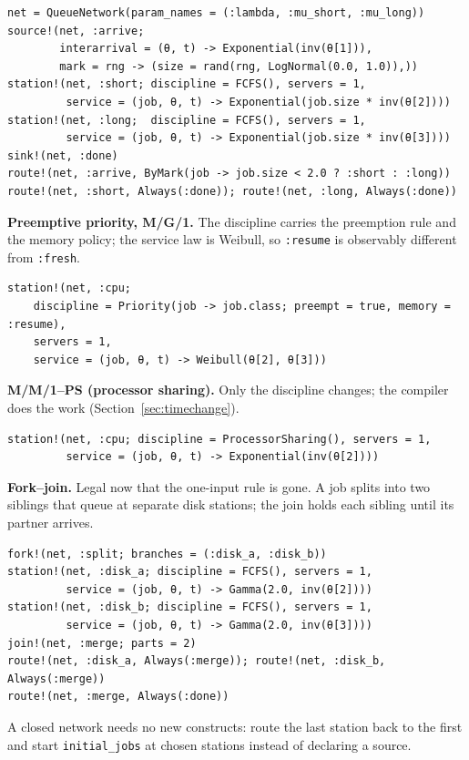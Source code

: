\documentclass[11pt]{article}
\newcommand{\code}[1]{\texttt{#1}}
\begin{document}
\begin{lstlisting}
net = QueueNetwork(param_names = (:lambda, :mu_short, :mu_long))
source!(net, :arrive;
        interarrival = (θ, t) -> Exponential(inv(θ[1])),
        mark = rng -> (size = rand(rng, LogNormal(0.0, 1.0)),))
station!(net, :short; discipline = FCFS(), servers = 1,
         service = (job, θ, t) -> Exponential(job.size * inv(θ[2])))
station!(net, :long;  discipline = FCFS(), servers = 1,
         service = (job, θ, t) -> Exponential(job.size * inv(θ[3])))
sink!(net, :done)
route!(net, :arrive, ByMark(job -> job.size < 2.0 ? :short : :long))
route!(net, :short, Always(:done)); route!(net, :long, Always(:done))
\end{lstlisting}

\textbf{Preemptive priority, M/G/1.} The discipline carries the preemption
rule and the memory policy; the service law is Weibull, so \code{:resume}
is observably different from \code{:fresh}.

\begin{lstlisting}
station!(net, :cpu;
    discipline = Priority(job -> job.class; preempt = true, memory = :resume),
    servers = 1,
    service = (job, θ, t) -> Weibull(θ[2], θ[3]))
\end{lstlisting}

\textbf{M/M/1--PS (processor sharing).} Only the discipline changes; the
compiler does the work (Section~\ref{sec:timechange}).

\begin{lstlisting}
station!(net, :cpu; discipline = ProcessorSharing(), servers = 1,
         service = (job, θ, t) -> Exponential(inv(θ[2])))
\end{lstlisting}

\textbf{Fork--join.} Legal now that the one-input rule is gone. A job splits
into two siblings that queue at separate disk stations; the join holds each
sibling until its partner arrives.

\begin{lstlisting}
fork!(net, :split; branches = (:disk_a, :disk_b))
station!(net, :disk_a; discipline = FCFS(), servers = 1,
         service = (job, θ, t) -> Gamma(2.0, inv(θ[2])))
station!(net, :disk_b; discipline = FCFS(), servers = 1,
         service = (job, θ, t) -> Gamma(2.0, inv(θ[3])))
join!(net, :merge; parts = 2)
route!(net, :disk_a, Always(:merge)); route!(net, :disk_b, Always(:merge))
route!(net, :merge, Always(:done))
\end{lstlisting}

A closed network needs no new constructs: route the last station back to the
first and start \code{initial\_jobs} at chosen stations instead of declaring a
source.
\end{document}
